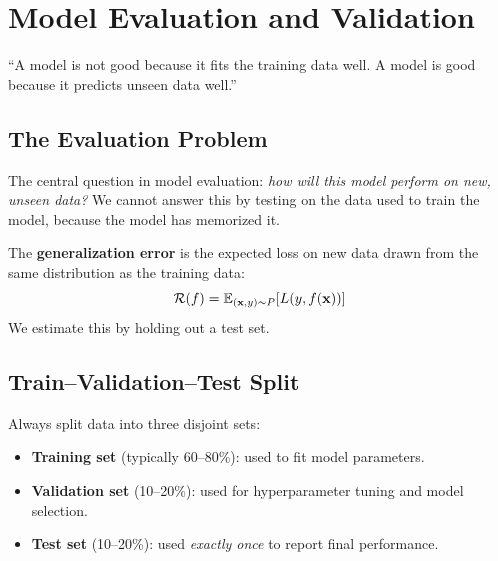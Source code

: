 \chapter{Model Evaluation and Validation}
\label{ch:evaluation}

\epigraph{``A model is not good because it fits the training data well. A model is good because it predicts unseen data well.''}{}


\section{The Evaluation Problem}

The central question in model evaluation: \emph{how will this model perform on new, unseen data?} We cannot answer this by testing on the data used to train the model, because the model has memorized it.

\begin{definition}
	The \textbf{generalization error} is the expected loss on new data drawn from the same distribution as the training data:
	\[
		\mathcal{R}(f) = \mathbb{E}_{(\mathbf{x}, y) \sim P}[L(y, f(\mathbf{x}))]
	\]
	We estimate this by holding out a test set.
\end{definition}

\section{Train--Validation--Test Split}

Always split data into three disjoint sets:

\begin{itemize}
	\item \textbf{Training set} (typically 60--80\%): used to fit model parameters.
	\item \textbf{Validation set} (10--20\%): used for hyperparameter tuning and model selection.
	\item \textbf{Test set} (10--20\%): used \emph{exactly once} to report final performance.
\end{itemize}

